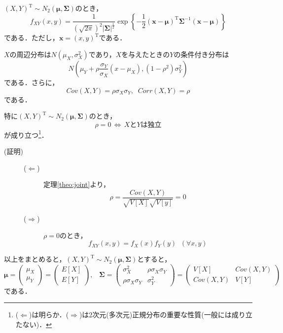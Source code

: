 \documentclass{jsreport}
\begin{document}
$(X, Y)^{\mathrm{T}} \sim N_2(\bm{\mu}, \bm{\Sigma})$のとき，
\begin{equation}
  f_{XY}(x, y) = \frac{1}{(\sqrt{2\pi})^2 |\bm{\Sigma}|^{\frac{1}{2}}} \exp\left\{
  -\frac{1}{2} (\bm{x} - \bm{\mu})^{\mathrm{T}} \bm{\Sigma}^{-1} (\bm{x}-\bm{\mu})
  \right\} \nonumber
\end{equation}
である．ただし，$\bm{x} = (x, y)^{\mathrm{T}}$である．

$X$の周辺分布は$N(\mu_X, \sigma_X^2)$であり，$X$を与えたときの$Y$の条件付き分布は
\begin{equation}
  N\left(\mu_Y + \rho \frac{\sigma_Y}{\sigma_X}(x - \mu_X), (1 - \rho^2)\sigma_Y^2\right) \nonumber
\end{equation}
である．さらに，
\begin{equation}
  Cov(X, Y) = \rho \sigma_X \sigma_Y, \;  \; Corr(X, Y) = \rho \nonumber
\end{equation}
である．

特に$(X, Y)^{\mathrm{T}} \sim N_2(\bm{\mu}, \bm{\Sigma})$のとき，
\begin{equation}
  \rho = 0 \, \Longleftrightarrow \, XとYは独立 \nonumber
\end{equation}
が成り立つ\footnote{
($\Longleftarrow$)は明らか．($\Longrightarrow$)は2次元(多次元)正規分布の重要な性質(一般には成り立たない)．
}．
\begin{description}
  \item[(証明)]
  \begin{description}
    \item[($\Longleftarrow$)]
    定理\ref{theo:joint}より，
    \begin{equation}
      \rho = \frac{Cov(X, Y)}{\sqrt{V[X]}\sqrt{V[y]}} = 0 \nonumber
    \end{equation}
    \item[($\Longrightarrow$)]
    $\rho = 0$のとき，
    \begin{equation}
      f_{XY}(x, y) = f_X(x)f_Y(y) \; \; (\forall x, y) \nonumber
    \end{equation}
  \end{description}
\end{description}

以上をまとめると，$(X, Y)^{\mathrm{T}} \sim N_2(\bm{\mu}, \bm{\Sigma})$とすると，
\begin{equation}
  \bm{\mu} = \left(
  \begin{array}{c}
    \mu_X \\
    \mu_Y
  \end{array}
  \right) = \left(
  \begin{array}{c}
    E[X] \\
    E[Y]
  \end{array}
  \right), \; \; \;
  \bm{\Sigma} = \left(
  \begin{array}{cc}
    \sigma_X^2 & \rho \sigma_X \sigma_Y \\
    \rho \sigma_X \sigma_Y & \sigma_Y^2
  \end{array}
  \right) = \left(
  \begin{array}{cc}
    V[X] & Cov(X, Y) \\
    Cov(X, Y) & V[Y]
  \end{array}
  \right) \nonumber
\end{equation}
である．
\end{document}
